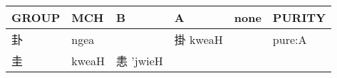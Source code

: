 \documentclass[14pt,a4paper]{scrartcl}
\begin{document}
\begin{longtable}[c]{@{}llllll@{}}
\toprule
\begin{minipage}[b]{0.14\columnwidth}\raggedright\strut
GROUP
\strut\end{minipage} &
\begin{minipage}[b]{0.14\columnwidth}\raggedright\strut
MCH
\strut\end{minipage} &
\begin{minipage}[b]{0.14\columnwidth}\raggedright\strut
B
\strut\end{minipage} &
\begin{minipage}[b]{0.14\columnwidth}\raggedright\strut
A
\strut\end{minipage} &
\begin{minipage}[b]{0.14\columnwidth}\raggedright\strut
none
\strut\end{minipage} &
\begin{minipage}[b]{0.14\columnwidth}\raggedright\strut
PURITY
\strut\end{minipage}\tabularnewline
\midrule
\endhead
\begin{minipage}[t]{0.14\columnwidth}\raggedright\strut
卦
\strut\end{minipage} &
\begin{minipage}[t]{0.14\columnwidth}\raggedright\strut
ngea
\strut\end{minipage} &
\begin{minipage}[t]{0.14\columnwidth}\raggedright\strut
\strut\end{minipage} &
\begin{minipage}[t]{0.14\columnwidth}\raggedright\strut
掛 kweaH
\strut\end{minipage} &
\begin{minipage}[t]{0.14\columnwidth}\raggedright\strut
\strut\end{minipage} &
\begin{minipage}[t]{0.14\columnwidth}\raggedright\strut
pure:A
\strut\end{minipage}\tabularnewline
\begin{minipage}[t]{0.14\columnwidth}\raggedright\strut
圭
\strut\end{minipage} &
\begin{minipage}[t]{0.14\columnwidth}\raggedright\strut
kweaH
\strut\end{minipage} &
\begin{minipage}[t]{0.14\columnwidth}\raggedright\strut
恚 'jwieH
\strut\end{minipage} &
\begin{minipage}[t]{0.14\columnwidth}\raggedright\strut

\end{minipage}
\end{longtable}
\end{document}
